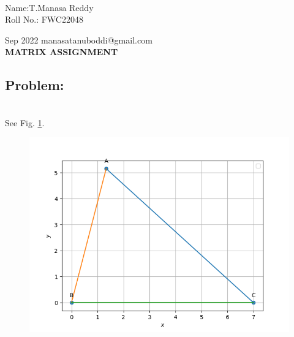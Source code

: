 \documentclass[10pt,a4paper]{report}
\begin{document}
 \vspace{3mm}\\ \raggedleft Name:T.Manasa Reddy\vspace{2mm}\\ \raggedleft Roll No.: FWC22048\vspace{2mm}\\ \raggedright Sep 2022 \hspace{12cm} \raggedleft manasatanuboddi@gmail.com \vspace{10mm}
\\ \centering \Large \textbf{MATRIX ASSIGNMENT} \normalsize \vspace{15mm}

\begin{multicols}{2}
\section{Problem:}  
\fi
	\\
	\solution 
	See Fig. 
		\ref{fig:9/11/2/1}.
	\begin{figure}[!h]
		\centering
 \includegraphics[width=\columnwidth]{chapters/9/11/2/1/figs/Figure_1.png}
		\caption{}
		\label{fig:9/11/2/1}
  	\end{figure}
	
\iffalse
	\vspace{3mm}

\end{multicols}
\end{document}
